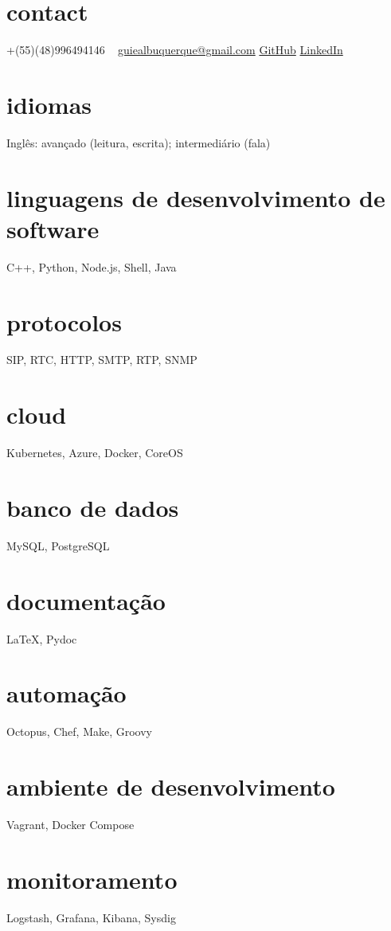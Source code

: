\documentclass[]{friggeri-cv} %
\begin{document}



\begin{aside} %
\section{contact}
+(55)(48)996494146
~
\href{mailto:guiealbuquerque@gmail.com}{guiealbuquerque@gmail.com}
\href{https://github.com/heisendumb}{GitHub}
\href{https://www.linkedin.com/in/heisenbugger/}{LinkedIn}
\section{idiomas}
Inglês: avançado (leitura, escrita); intermediário (fala)
\section{linguagens de desenvolvimento de software}
C++, Python, Node.js, Shell, Java
\section{protocolos}
SIP, RTC, HTTP, SMTP, RTP, SNMP
\section{cloud}
Kubernetes, Azure, Docker, CoreOS
\section{banco de dados}
MySQL, PostgreSQL
\section{documentação}
LaTeX, Pydoc
\section{automação}
Octopus, Chef, Make, Groovy
\section{ambiente de desenvolvimento}
Vagrant, Docker Compose
\section{monitoramento}
Logstash, Grafana, Kibana, Sysdig
\end{aside}
\end{document}
